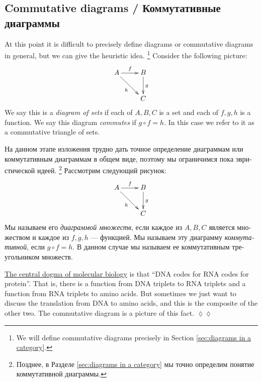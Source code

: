 \documentclass[a4paper]{book}
\def\Set{{\bf Set}}
\theoremstyle{myth}
\newtheorem{appENG}[envENG]{\begin{english}Application\end{english}}
\newenvironment{applicationENG}{\begin{appENG}}{\hspace*{\fill}$\lozenge\lozenge$\end{appENG}}
\begin{document}
\begin{russian}

\section{Commutative diagrams / Коммутативные диаграммы}\label{sec:comm diag}
\addtocounter{subsection}{1}\setcounter{subsubsection}{0}

At this point it is difficult to precisely define diagrams or commutative diagrams in general, but we can give the heuristic idea.%
\footnote{We will define commutative diagrams precisely in Section \ref{sec:diagrams in a category}.}
Consider the following picture: 
\begin{align}\label{dia:triangle}
\xymatrix{A\ar[r]^f\ar[rd]_h&B\ar[d]^g\\&C}
\end{align}
We say this is a {\em diagram of sets}\index{diagram!in $\Set$} if each of $A,B,C$ is a set and each of $f,g,h$ is a function. We say this diagram {\em commutes} if $g\circ f = h$. In this case we refer to it as a commutative triangle of sets.

На данном этапе изложения трудно дать точное определение диаграммам или коммутативным диаграммам в общем виде, поэтому мы ограничимся пока эвристической идеей.%
\footnote{Позднее, в Разделе \ref{sec:diagrams in a category} мы точно определим понятие коммутативной диаграммы.}
Рассмотрим следующий рисунок: 
\begin{align}\label{dia:triangle}
\xymatrix{A\ar[r]^f\ar[rd]_h&B\ar[d]^g\\&C}
\end{align}
Мы называем его {\em диаграммой множеств}\index{диаграмма!в $\Set$}, если каждое из $A,B,C$ является множеством и каждое из $f,g,h$ — функцией. Мы называем эту диаграмму {\em коммутативной}, если $g\circ f = h$. В данном случае мы называем ее коммутативным треугольником множеств.

\begin{applicationENG}
\href{http://en.wikipedia.org/wiki/Central_dogma_of_molecular_biology}{\text The central dogma of molecular biology} is that “DNA codes for RNA codes for protein”. That is, there is a function from DNA triplets to RNA triplets and a function from RNA triplets to amino acids. But sometimes we just want to discuss the translation from DNA to amino acids, and this is the composite of the other two. The commutative diagram is a picture of this fact.
\end{applicationENG}


\end{russian}
\end{document}
